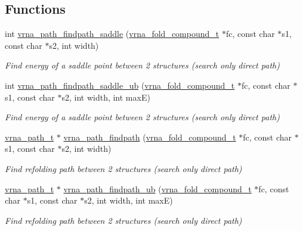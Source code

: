 \subsection*{Functions}
\begin{DoxyCompactItemize}
\item 
int \mbox{\hyperlink{group__paths__direct_gad77dbfa125158f534147c0015a849bc3}{vrna\+\_\+path\+\_\+findpath\+\_\+saddle}} (\mbox{\hyperlink{group__fold__compound_ga1b0cef17fd40466cef5968eaeeff6166}{vrna\+\_\+fold\+\_\+compound\+\_\+t}} $\ast$fc, const char $\ast$s1, const char $\ast$s2, int width)
\begin{DoxyCompactList}\small\item\em Find energy of a saddle point between 2 structures (search only direct path) \end{DoxyCompactList}\item 
int \mbox{\hyperlink{group__paths__direct_gaca6d3ab6f8b9463e3382bd1f474c26f1}{vrna\+\_\+path\+\_\+findpath\+\_\+saddle\+\_\+ub}} (\mbox{\hyperlink{group__fold__compound_ga1b0cef17fd40466cef5968eaeeff6166}{vrna\+\_\+fold\+\_\+compound\+\_\+t}} $\ast$fc, const char $\ast$s1, const char $\ast$s2, int width, int maxE)
\begin{DoxyCompactList}\small\item\em Find energy of a saddle point between 2 structures (search only direct path) \end{DoxyCompactList}\item 
\mbox{\hyperlink{group__paths_ga818d4f3d1cf8723d6905990b08d909fe}{vrna\+\_\+path\+\_\+t}} $\ast$ \mbox{\hyperlink{group__paths__direct_ga2fed8ff126f5becd82cedd81a25c9bf0}{vrna\+\_\+path\+\_\+findpath}} (\mbox{\hyperlink{group__fold__compound_ga1b0cef17fd40466cef5968eaeeff6166}{vrna\+\_\+fold\+\_\+compound\+\_\+t}} $\ast$fc, const char $\ast$s1, const char $\ast$s2, int width)
\begin{DoxyCompactList}\small\item\em Find refolding path between 2 structures (search only direct path) \end{DoxyCompactList}\item 
\mbox{\hyperlink{group__paths_ga818d4f3d1cf8723d6905990b08d909fe}{vrna\+\_\+path\+\_\+t}} $\ast$ \mbox{\hyperlink{group__paths__direct_gad00765c2f269fddfa319310af22d4f67}{vrna\+\_\+path\+\_\+findpath\+\_\+ub}} (\mbox{\hyperlink{group__fold__compound_ga1b0cef17fd40466cef5968eaeeff6166}{vrna\+\_\+fold\+\_\+compound\+\_\+t}} $\ast$fc, const char $\ast$s1, const char $\ast$s2, int width, int maxE)
\begin{DoxyCompactList}\small\item\em Find refolding path between 2 structures (search only direct path) \end{DoxyCompactList}\item 

\end{DoxyCompactItemize}
